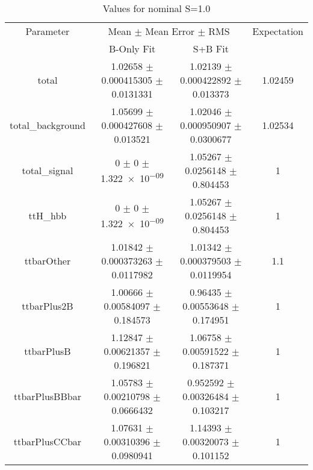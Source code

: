 \begin{table}
\centering
\caption{Values for nominal S=1.0}
\begin{tabular}{cccc}
\toprule
Parameter & \multicolumn{2}{c}{Mean $\pm$ Mean Error $\pm$ RMS} & Expectation\\
 & B-Only Fit & S+B Fit & \\
\midrule
total & \num{1.02658} $\pm$ \num{0.000415305} $\pm$ \num{0.0131331} & \num{1.02139} $\pm$ \num{0.000422892} $\pm$ \num{0.013373} & \num{1.02459}\\
total\_background & \num{1.05699} $\pm$ \num{0.000427608} $\pm$ \num{0.013521} & \num{1.02046} $\pm$ \num{0.000950907} $\pm$ \num{0.0300677} & \num{1.02534}\\
total\_signal & \num{0} $\pm$ \num{0} $\pm$ \num{1.322e-09} & \num{1.05267} $\pm$ \num{0.0256148} $\pm$ \num{0.804453} & \num{1}\\
ttH\_hbb & \num{0} $\pm$ \num{0} $\pm$ \num{1.322e-09} & \num{1.05267} $\pm$ \num{0.0256148} $\pm$ \num{0.804453} & \num{1}\\
ttbarOther & \num{1.01842} $\pm$ \num{0.000373263} $\pm$ \num{0.0117982} & \num{1.01342} $\pm$ \num{0.000379503} $\pm$ \num{0.0119954} & \num{1.1}\\
ttbarPlus2B & \num{1.00666} $\pm$ \num{0.00584097} $\pm$ \num{0.184573} & \num{0.96435} $\pm$ \num{0.00553648} $\pm$ \num{0.174951} & \num{1}\\
ttbarPlusB & \num{1.12847} $\pm$ \num{0.00621357} $\pm$ \num{0.196821} & \num{1.06758} $\pm$ \num{0.00591522} $\pm$ \num{0.187371} & \num{1}\\
ttbarPlusBBbar & \num{1.05783} $\pm$ \num{0.00210798} $\pm$ \num{0.0666432} & \num{0.952592} $\pm$ \num{0.00326484} $\pm$ \num{0.103217} & \num{1}\\
ttbarPlusCCbar & \num{1.07631} $\pm$ \num{0.00310396} $\pm$ \num{0.0980941} & \num{1.14393} $\pm$ \num{0.00320073} $\pm$ \num{0.101152} & \num{1}\\
\bottomrule
\end{tabular}
\end{table}